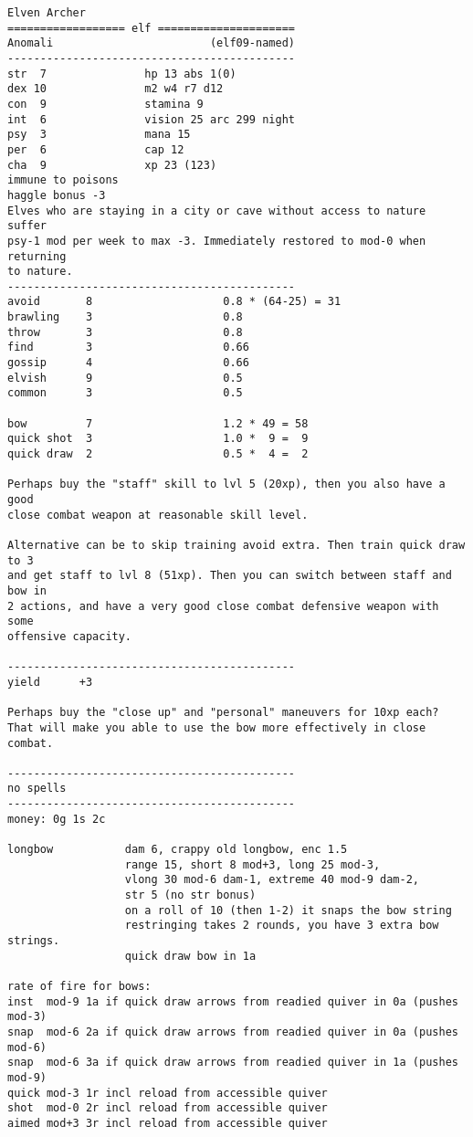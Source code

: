 \pagebreak[1]
\tiny \begin{samepage} \begin{verbatim}
Elven Archer
================== elf =====================
Anomali                        (elf09-named)
--------------------------------------------
str  7               hp 13 abs 1(0)
dex 10               m2 w4 r7 d12
con  9               stamina 9
int  6               vision 25 arc 299 night
psy  3               mana 15
per  6               cap 12
cha  9               xp 23 (123)
immune to poisons
haggle bonus -3
Elves who are staying in a city or cave without access to nature suffer
psy-1 mod per week to max -3. Immediately restored to mod-0 when returning
to nature.
--------------------------------------------
avoid       8                    0.8 * (64-25) = 31
brawling    3                    0.8
throw       3                    0.8
find        3                    0.66
gossip      4                    0.66
elvish      9                    0.5
common      3                    0.5

bow         7                    1.2 * 49 = 58
quick shot  3                    1.0 *  9 =  9
quick draw  2                    0.5 *  4 =  2

Perhaps buy the "staff" skill to lvl 5 (20xp), then you also have a good
close combat weapon at reasonable skill level.

Alternative can be to skip training avoid extra. Then train quick draw to 3
and get staff to lvl 8 (51xp). Then you can switch between staff and bow in
2 actions, and have a very good close combat defensive weapon with some
offensive capacity.

--------------------------------------------
yield      +3

Perhaps buy the "close up" and "personal" maneuvers for 10xp each?
That will make you able to use the bow more effectively in close combat.

--------------------------------------------
no spells
--------------------------------------------
money: 0g 1s 2c

longbow           dam 6, crappy old longbow, enc 1.5
                  range 15, short 8 mod+3, long 25 mod-3,
                  vlong 30 mod-6 dam-1, extreme 40 mod-9 dam-2,
                  str 5 (no str bonus)
                  on a roll of 10 (then 1-2) it snaps the bow string
                  restringing takes 2 rounds, you have 3 extra bow strings.
                  quick draw bow in 1a

rate of fire for bows:
inst  mod-9 1a if quick draw arrows from readied quiver in 0a (pushes mod-3)
snap  mod-6 2a if quick draw arrows from readied quiver in 0a (pushes mod-6)
snap  mod-6 3a if quick draw arrows from readied quiver in 1a (pushes mod-9)
quick mod-3 1r incl reload from accessible quiver
shot  mod-0 2r incl reload from accessible quiver
aimed mod+3 3r incl reload from accessible quiver


\end{verbatim}
\end{samepage}
